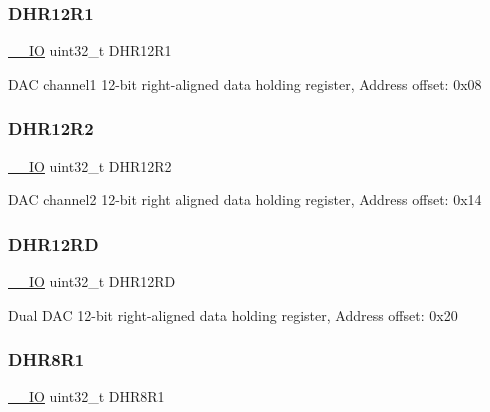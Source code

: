\subsubsection{\texorpdfstring{D\+H\+R12\+R1}{DHR12R1}}
{\footnotesize\ttfamily \hyperlink{core__sc300_8h_aec43007d9998a0a0e01faede4133d6be}{\+\_\+\+\_\+\+IO} uint32\+\_\+t D\+H\+R12\+R1}

D\+AC channel1 12-\/bit right-\/aligned data holding register, Address offset\+: 0x08 \mbox{\label{struct_d_a_c___type_def_a804c7e15dbb587c7ea25511f6a7809f7}} 
\subsubsection{\texorpdfstring{D\+H\+R12\+R2}{DHR12R2}}
{\footnotesize\ttfamily \hyperlink{core__sc300_8h_aec43007d9998a0a0e01faede4133d6be}{\+\_\+\+\_\+\+IO} uint32\+\_\+t D\+H\+R12\+R2}

D\+AC channel2 12-\/bit right aligned data holding register, Address offset\+: 0x14 \mbox{\label{struct_d_a_c___type_def_a1590b77e57f17e75193da259da72095e}} 
\subsubsection{\texorpdfstring{D\+H\+R12\+RD}{DHR12RD}}
{\footnotesize\ttfamily \hyperlink{core__sc300_8h_aec43007d9998a0a0e01faede4133d6be}{\+\_\+\+\_\+\+IO} uint32\+\_\+t D\+H\+R12\+RD}

Dual D\+AC 12-\/bit right-\/aligned data holding register, Address offset\+: 0x20 \mbox{\label{struct_d_a_c___type_def_ad0a200e12acad17a5c7d2059159ea7e1}} 
\subsubsection{\texorpdfstring{D\+H\+R8\+R1}{DHR8R1}}
{\footnotesize\ttfamily \hyperlink{core__sc300_8h_aec43007d9998a0a0e01faede4133d6be}{\+\_\+\+\_\+\+IO} uint32\+\_\+t D\+H\+R8\+R1}

